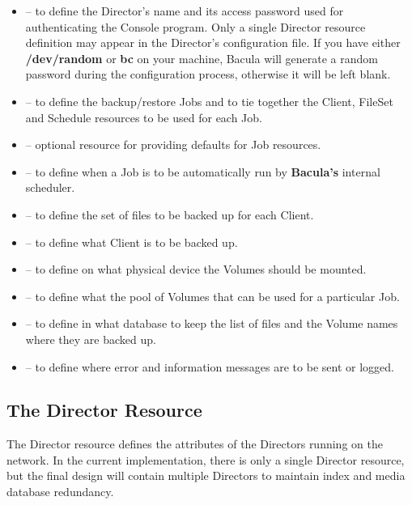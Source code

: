 \begin{itemize}
\item 
    -- to  define the Director's
   name and its access password used for  authenticating the Console program.
Only a single  Director resource definition may appear in the Director's 
configuration file.  If you have either {\bf /dev/random} or  {\bf bc} on your
machine, Bacula will generate a random  password during the configuration
process, otherwise it will  be left blank. 
\item 
    -- to define the backup/restore Jobs 
   and to tie together the Client, FileSet and Schedule resources to  be used for
each Job.  
\item 
    -- optional resource for 
   providing defaults for Job resources.  
\item 
    -- to define when a Job is to 
   be automatically run by {\bf Bacula's} internal scheduler.  
\item 
    -- to define the set of files 
   to be backed up for each Client. 
\item 
    -- to define what Client is  to be
   backed up.  
\item 
    -- to define on what  physical
   device the Volumes should be mounted. 
\item 
    -- to define what  the pool of Volumes
   that can be used for a particular Job. 
\item 
    -- to define in what database to
 keep the list of files and the Volume names where they are backed up.  
\item 
    -- to define where error  and
   information messages are to be sent or logged. 
\end{itemize}

\subsection*{The Director Resource}
\label{DirectorResource4}

The Director resource defines the attributes of the Directors running on the
network. In the current implementation, there is only a single Director
resource, but the final design will contain multiple Directors to maintain
index and media database redundancy. 

